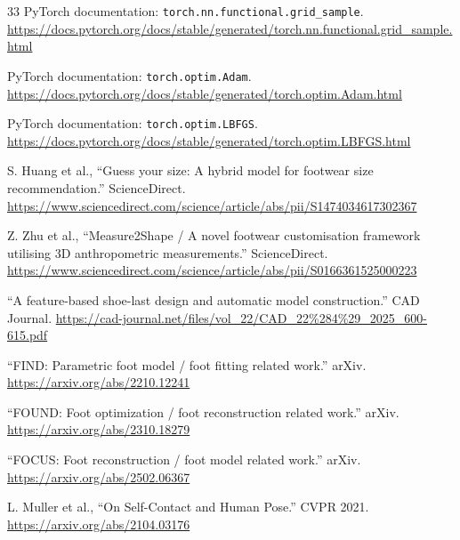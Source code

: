 \documentclass[11pt]{article}
\begin{document}
\begin{thebibliography}{33}
PyTorch documentation: \texttt{torch.nn.functional.grid\_sample}.
\url{https://docs.pytorch.org/docs/stable/generated/torch.nn.functional.grid_sample.html}

PyTorch documentation: \texttt{torch.optim.Adam}.
\url{https://docs.pytorch.org/docs/stable/generated/torch.optim.Adam.html}

PyTorch documentation: \texttt{torch.optim.LBFGS}.
\url{https://docs.pytorch.org/docs/stable/generated/torch.optim.LBFGS.html}

S. Huang et al.,
``Guess your size: A hybrid model for footwear size recommendation.''
ScienceDirect.
\url{https://www.sciencedirect.com/science/article/abs/pii/S1474034617302367}

Z. Zhu et al.,
``Measure2Shape / A novel footwear customisation framework utilising 3D anthropometric measurements.''
ScienceDirect.
\url{https://www.sciencedirect.com/science/article/abs/pii/S0166361525000223}

``A feature-based shoe-last design and automatic model construction.''
CAD Journal.
\url{https://cad-journal.net/files/vol_22/CAD_22%284%29_2025_600-615.pdf}

``FIND: Parametric foot model / foot fitting related work.''
arXiv.
\url{https://arxiv.org/abs/2210.12241}

``FOUND: Foot optimization / foot reconstruction related work.''
arXiv.
\url{https://arxiv.org/abs/2310.18279}

``FOCUS: Foot reconstruction / foot model related work.''
arXiv.
\url{https://arxiv.org/abs/2502.06367}

L. Muller et al.,
``On Self-Contact and Human Pose.''
CVPR 2021.
\url{https://arxiv.org/abs/2104.03176}

\end{thebibliography}
\end{document}
